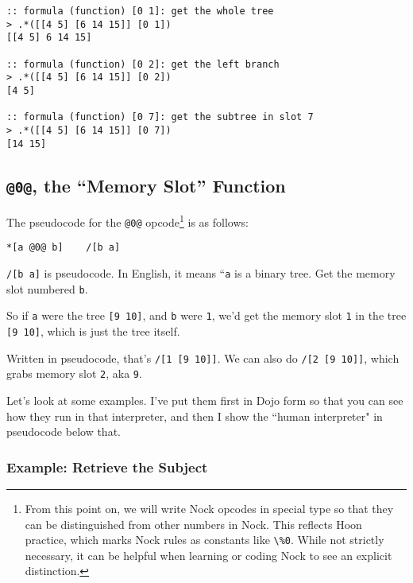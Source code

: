 \documentclass[twoside]{article}
\begin{document}
\begin{lstlisting}[style=listingcode]
:: formula (function) [0 1]: get the whole tree
> .*([[4 5] [6 14 15]] [0 1])
[[4 5] 6 14 15]

:: formula (function) [0 2]: get the left branch
> .*([[4 5] [6 14 15]] [0 2])
[4 5]

:: formula (function) [0 7]: get the subtree in slot 7
> .*([[4 5] [6 14 15]] [0 7])
[14 15]
\end{lstlisting}

\subsection{\lstinline[style=inlinecode]{@0@}, the “Memory Slot” Function}
\label{sxn:nock0}

The pseudocode for the \lstinline[style=inlinecode]{@0@} opcode\footnote{From this point on, we will write Nock opcodes in special type so that they can be distinguished from other numbers in Nock.  This reflects Hoon practice, which marks Nock rules as constants like \lstinline[style=inlinecode]{\%0}.  While not strictly necessary, it can be helpful when learning or coding Nock to see an explicit distinction.} is as follows:

\begin{lstlisting}[style=listingcode]
*[a @0@ b]    /[b a]
\end{lstlisting}

\lstinline[style=inlinecode]{/[b a]} is pseudocode. In English, it means ``\lstinline[style=inlinecode]{a} is a binary tree. Get the memory slot numbered \lstinline[style=inlinecode]{b}.

So if \lstinline[style=inlinecode]{a} were the tree \lstinline[style=inlinecode]{[9 10]}, and \lstinline[style=inlinecode]{b} were \lstinline[style=inlinecode]{1}, we'd get the memory slot \lstinline[style=inlinecode]{1} in the tree \lstinline[style=inlinecode]{[9 10]}, which is just the tree itself.

Written in pseudocode, that's \lstinline[style=inlinecode]{/[1 [9 10]]}. We can also do \lstinline[style=inlinecode]{/[2 [9 10]]}, which grabs memory slot \lstinline[style=inlinecode]{2}, aka \lstinline[style=inlinecode]{9}.

Let's look at some examples. I've put them first in Dojo form so that you can see how they run in that interpreter, and then I show the ``human interpreter" in pseudocode below that.

\subsubsection{Example:  Retrieve the Subject}
\end{document}
